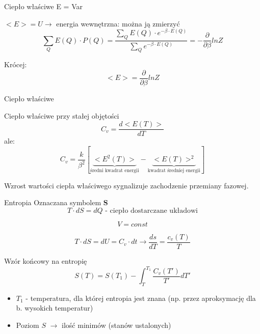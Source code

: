 	\begin{frame}{Ciepło właściwe}
		E = Var
		\begin{block}{$ <E> = U \rightarrow$ energia wewnętrzna: można ją zmierzyć}
			$$
			\sum_Q E(Q) \cdot P(Q) = \dfrac{\sum_Q E(Q) \cdot e^{-\beta\cdot E(Q)}}{\sum_Q e^{-\beta\cdot E(Q)}} = - \frac{\partial}{\partial \beta} ln Z
			$$
		\end{block}
	
		\begin{block}{Krócej:}
			$$
			<E> = \frac{\partial}{\partial \beta} ln Z
			$$
		\end{block}	
	\end{frame}
	
	\begin{frame}{Ciepło właściwe}
		\begin{block}{Ciepło właściwe przy stałej objętości}
			$$
			C_v = \frac{d<E(T)>}{dT}
			$$
			ale:
			$$
			C_v = \frac{k}{\beta^2}[\underbrace{<E^2(T)>}_{\text{średni kwadrat energii}} - \underbrace{<E(T)>^2}_{\text{kwadrat średniej energii}}]
			$$
		\end{block}		
	
	Wzrost wartości ciepła właściwego sygnalizuje zachodzenie przemiany fazowej.	
	\end{frame}

	\begin{frame}{Entropia}
		Oznaczana symbolem \textbf{S}
		$$
		T \cdot dS = dQ \text{ - ciepło dostarczane układowi}
		$$
		
		$$
		V = const
		$$
		
		$$
		T \cdot dS = dU = C_v \cdot dt \rightarrow \frac{ds}{dT} = \frac{c_v(T)}{T}
		$$
		
		\begin{block}{Wzór końcowy na entropię}
			$$
			S(T) = S(T_1) - \int_T^{T_1} \frac{C_v(T')}{T'}dT'
			$$
		\end{block}
		
		\begin{itemize}
			\item $T_1$ - temperatura, dla której entropia jest znana (np. przez aproksymację dla b. wysokich temperatur)
			\item Poziom $S$ $\rightarrow$ ilość minimów (stanów ustalonych)		
		\end{itemize}
	\end{frame}










